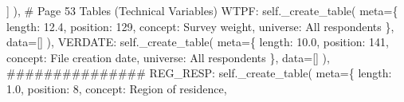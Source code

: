 \documentclass[
  11pt,
  a4paper,
]{article}
\newenvironment{Shaded}{\begin{snugshade}}{\end{snugshade}}
\newcommand{\CommentTok}[1]{\textcolor[rgb]{0.37,0.37,0.37}{#1}}
\newcommand{\NormalTok}[1]{\textcolor[rgb]{0.00,0.23,0.31}{#1}}
\newcommand{\OperatorTok}[1]{\textcolor[rgb]{0.37,0.37,0.37}{#1}}
\newcommand{\StringTok}[1]{\textcolor[rgb]{0.13,0.47,0.30}{#1}}
\newcommand{\VariableTok}[1]{\textcolor[rgb]{0.07,0.07,0.07}{#1}}
\begin{document}
\begin{Shaded}
\begin{Highlighting}[]
\NormalTok{                ]}
\NormalTok{            ),}
            \CommentTok{\# Page 53 Tables (Technical Variables)}
            \StringTok{\textquotesingle{}WTPF\textquotesingle{}}\NormalTok{: }\VariableTok{self}\NormalTok{.\_create\_table(}
\NormalTok{                meta}\OperatorTok{=}\NormalTok{\{}
                    \StringTok{\textquotesingle{}length\textquotesingle{}}\NormalTok{: }\StringTok{\textquotesingle{}12.4\textquotesingle{}}\NormalTok{, }\StringTok{\textquotesingle{}position\textquotesingle{}}\NormalTok{: }\StringTok{\textquotesingle{}129\textquotesingle{}}\NormalTok{,}
                    \StringTok{\textquotesingle{}concept\textquotesingle{}}\NormalTok{: }\StringTok{\textquotesingle{}Survey weight\textquotesingle{}}\NormalTok{,}
                    \StringTok{\textquotesingle{}universe\textquotesingle{}}\NormalTok{: }\StringTok{\textquotesingle{}All respondents\textquotesingle{}}
\NormalTok{                \},}
\NormalTok{                data}\OperatorTok{=}\NormalTok{[]}
\NormalTok{            ),}
            \StringTok{\textquotesingle{}VERDATE\textquotesingle{}}\NormalTok{: }\VariableTok{self}\NormalTok{.\_create\_table(}
\NormalTok{                meta}\OperatorTok{=}\NormalTok{\{}
                    \StringTok{\textquotesingle{}length\textquotesingle{}}\NormalTok{: }\StringTok{\textquotesingle{}10.0\textquotesingle{}}\NormalTok{, }\StringTok{\textquotesingle{}position\textquotesingle{}}\NormalTok{: }\StringTok{\textquotesingle{}141\textquotesingle{}}\NormalTok{,}
                    \StringTok{\textquotesingle{}concept\textquotesingle{}}\NormalTok{: }\StringTok{\textquotesingle{}File creation date\textquotesingle{}}\NormalTok{,}
                    \StringTok{\textquotesingle{}universe\textquotesingle{}}\NormalTok{: }\StringTok{\textquotesingle{}All respondents\textquotesingle{}}
\NormalTok{                \},}
\NormalTok{                data}\OperatorTok{=}\NormalTok{[]}
\NormalTok{            ),}
            \CommentTok{\#\#\#\#\#\#\#\#\#\#\#\#\#\#\#}
            \StringTok{\textquotesingle{}REG\_RESP\textquotesingle{}}\NormalTok{: }\VariableTok{self}\NormalTok{.\_create\_table(}
\NormalTok{                meta}\OperatorTok{=}\NormalTok{\{}
                \StringTok{\textquotesingle{}length\textquotesingle{}}\NormalTok{: }\StringTok{\textquotesingle{}1.0\textquotesingle{}}\NormalTok{, }\StringTok{\textquotesingle{}position\textquotesingle{}}\NormalTok{: }\StringTok{\textquotesingle{}8\textquotesingle{}}\NormalTok{,}
                \StringTok{\textquotesingle{}concept\textquotesingle{}}\NormalTok{: }\StringTok{\textquotesingle{}Region of residence\textquotesingle{}}\NormalTok{,}

\end{Highlighting}
\end{Shaded}
\end{document}
